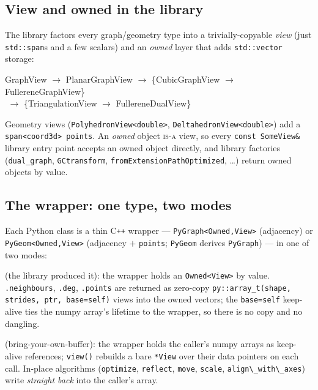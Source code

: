 \documentclass[11pt]{article}
\newcommand{\code}[1]{\lstinline[style=py]!#1!}
\begin{document}
\subsection{View and owned in the library}
The library factors every graph/geometry type into a trivially-copyable \emph{view}
(just \texttt{std::span}s and a few scalars) and an \emph{owned} layer that adds
\texttt{std::vector} storage:
\begin{center}\small\ttfamily
GraphView $\to$ PlanarGraphView $\to$ \{CubicGraphView $\to$ FullereneGraphView\}\\
\phantom{GraphView $\to$ PlanarGraphView $\to$}\,\,$\to$ \{TriangulationView $\to$ FullereneDualView\}
\end{center}
Geometry views (\texttt{PolyhedronView<double>}, \texttt{DeltahedronView<double>}) add a
\texttt{span<coord3d> points}. An \emph{owned} object \textsc{is-a} view, so every
\texttt{const SomeView\&} library entry point accepts an owned object directly, and library
factories (\texttt{dual\_graph}, \texttt{GCtransform}, \texttt{fromExtensionPathOptimized},
\ldots) return owned objects by value.

\subsection{The wrapper: one type, two modes}
Each Python class is a thin C\texttt{++} wrapper --- \code{PyGraph<Owned,View>} (adjacency)
or \code{PyGeom<Owned,View>} (adjacency $+$ \texttt{points}; \code{PyGeom} derives
\code{PyGraph}) --- in one of two modes:

\begin{description}[leftmargin=1.4em]
\item[Owned mode] (the library produced it): the wrapper holds an \texttt{Owned<View>} by
  value. \code{.neighbours}, \code{.deg}, \code{.points} are returned as zero-copy
  \code{py::array_t(shape, strides, ptr, base=self)} views into the owned vectors; the
  \texttt{base=self} keep-alive ties the numpy array's lifetime to the wrapper, so there is
  no copy and no dangling.
\item[View mode] (bring-your-own-buffer): the wrapper holds the caller's numpy arrays as
  keep-alive references; \code{view()} rebuilds a bare \texttt{*View} over their data
  pointers on each call. In-place algorithms (\code{optimize}, \code{reflect},
  \code{move}, \code{scale}, \code{align\_with\_axes}) write \emph{straight back} into the
  caller's array.
\end{description}
\end{document}
